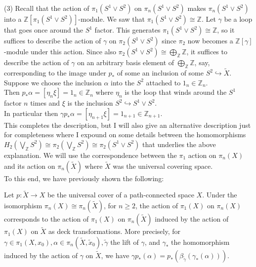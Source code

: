 \begin{solution}
    (3) 
    Recall that
    the action of $\pi_1 \left( S^{1} \vee S^2 \right) $ 
    on $\pi_n \left( S^{1} \vee S^{2} \right) $ 
    makes $\pi_n \left( S^{1} \vee S^2 \right) $ 
    into a $\mathbb{Z} \left[ \pi_1 \left( S^{1} \vee S^2 \right) 
    \right] $-module. We saw that
    $\pi_1 \left( S^{1} \vee S^2 \right) \cong \mathbb{Z}$. Let
    $\gamma$ be a loop that goes once around the $S^{1}$ factor.
    This generates $\pi_1 \left( S^{1} \vee S^2 \right) 
    \cong \mathbb{Z}$, so it suffices
    to describe the action of $\gamma$ on
    $\pi_2 \left( S^{1} \vee S^2 \right) $ since
    $\pi_2$ now becomes a $\mathbb{Z}\left[ \gamma \right] $-module
    under this action.
    Since also $\pi_2 \left( S^{1} \vee S^2 \right) 
    \cong \bigoplus_{\mathbb{Z}} \mathbb{Z}$, it
    suffices to describe the action of
    $\gamma$ on an arbitrary basis element
    of $\bigoplus_{\mathbb{Z}}\mathbb{Z}$, say,
    corresponding to the image under $p_*$ of
    some an inclusion of some $S^2 \hookrightarrow 
    \tilde{X}$. Suppose we choose the inclusion
    $\alpha$ into the $S^2$ attached to $1_n \in \mathbb{Z}_n$.\\
    Then $p_* \alpha = \left[ \eta_n \xi \right]
    = 1_{n} \in \mathbb{Z}_n$ where
    $\eta_n$ is the loop that winds around the $S^{1}$ factor
    $n$ times and $\xi$ is the inclusion
    $S^2 \hookrightarrow S^{1} \vee S^2$.\\
    In particular then
    $\gamma p_* \alpha = \left[ \eta_{n+1} \xi \right] 
    = 1_{n+1} \in \mathbb{Z}_{n+1}$.\\
    \linebreak
    This completes the description, but I will also
    give an alternative description just for
    completeness where I expound on some details
    between the homomorphisms
    $H_2 \left( \bigvee_{\mathbb{Z}}S^2 \right) 
    \cong \pi_2 \left( \bigvee_{\mathbb{Z}} S^2 \right) 
    \cong \pi_2 \left( S^{1} \vee S^2 \right) $ that underlies
    the above explanation. We will use the correspondence between
    the $\pi_1$ action on $\pi_n (X)$ and its action
    on $\pi_n \left( \tilde{X} \right)  $ where
    $\tilde{X}$ was the universal covering space.\\
    To this end, we have previously shown the following:
    \begin{lemma}[]
        Let $p \colon \tilde{X} \to X$ be the universal cover
        of a path-connected space $X$. Under
        the isomorphism $\pi_n (X) \cong \pi_n (\tilde{X})$, for
        $n\ge 2$, the action of $\pi_1 (X)$ on
        $\pi_n (X)$ corresponds to the action
        of $\pi_1(X)$ on $\pi_n \left( \tilde{X} \right) $ 
        induced by the action of $\pi_1 (X)$ on
        $\tilde{X}$ as deck transformations.
        More precisely,
        for $\gamma \in \pi_1 \left( X, x_0 \right) ,
        \alpha \in \pi_n \left( \tilde{X},
        \tilde{x}_0 \right) ,
        \tilde{\gamma}$  the lift of $\gamma$, and
        $\gamma_*$ the homomorphism induced
        by the action of $\gamma$ on $\tilde{X}$, we have
        $\gamma p_* \left( \alpha \right) =
        p_* \left( \beta_{\tilde{\gamma}} 
        \left( \gamma_* \left( \alpha \right)  \right) \right) $.
    \end{lemma}


\end{solution}

